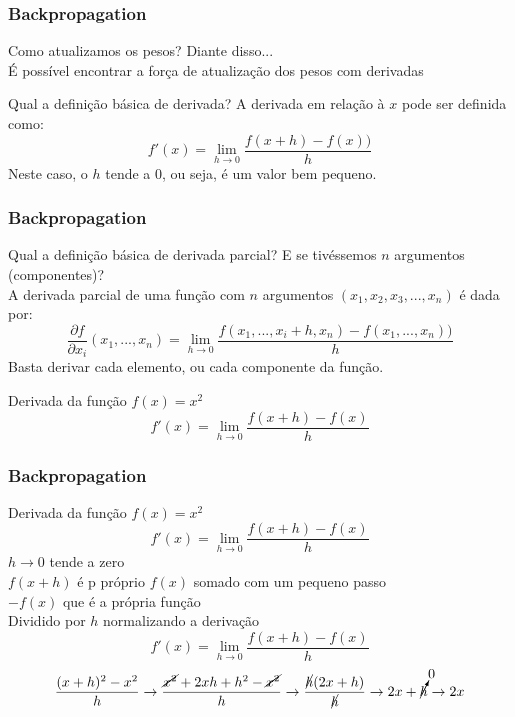 \documentclass{beamer}
\begin{document}
\begin{frame}
	\frametitle{Backpropagation}
	\begin{block}{Como atualizamos os pesos?}
		Diante disso... \\
		É possível encontrar a força de atualização dos pesos com \alert{derivadas}
		
			\href{https://github.com/mafaldasalomao/pavic_treinamento_ml/blob/main/Machine_Learning/figures/random_01.gif?raw=true}{} 
	\end{block}
	\begin{block}{Qual a definição básica de derivada?}
		A derivada em relação à $x$ pode ser definida como:
		$$f'(x) = \lim_{h\rightarrow 0} \frac{f(x + h) - f (x))}{h}$$
		Neste caso, o $h$ tende a $0$, ou seja, é um valor bem pequeno.
	\end{block}
\end{frame}
\begin{frame}
	\frametitle{Backpropagation}
	\begin{block}{Qual a definição básica de derivada parcial?}
		E se tivéssemos $n$ argumentos (componentes)? \\
		A derivada parcial de uma função com $n$ argumentos $(x_1, x_2, x_3,...,x_n)$ é dada por:
		$$\frac{\partial f}{\partial x_i}(x_1,...,x_n) = \lim_{h \rightarrow 0} \frac{f(x_1, ...,x_i + h, x_n) - f (x_1, ..., x_n))}{h}$$
		Basta derivar cada elemento, ou cada componente da função.
	\end{block}
\begin{example}
	Derivada da função $f(x) = x^2$ \\
	$$f'(x) = \lim_{h \rightarrow 0} \frac{f(x + h)-f(x)}{h}$$
\end{example}
\end{frame}
\begin{frame}
	\frametitle{Backpropagation}
	\begin{example}
		Derivada da função $f(x) = x^2$ \\
		$$f'(x) = \lim_{h \rightarrow 0} \frac{f(x + h)-f(x)}{h}$$
		$h \rightarrow 0$ tende a zero \\
		$f(x + h)$ é p próprio $f(x)$ somado com um pequeno passo \\
		$- f(x)$ que é a própria função \\
		Dividido por $h$ normalizando a derivação \\
		$$f'(x) = \lim_{h \rightarrow 0} \frac{f(x + h)-f(x)}{h}$$
		\renewcommand{\CancelColor}{\color{red}}
		$$\frac{(x+h)^2 - x^2}{h} \rightarrow \frac{\cancel{x^2}+ 2xh +h^2 - \cancel{ x^2}}{h} \rightarrow \frac{\cancel{h}(2x + h)}{\cancel{h}} \rightarrow 2x+\cancelto{0}{h}  \rightarrow 2x$$
	\end{example}
\end{frame}
\end{document}
